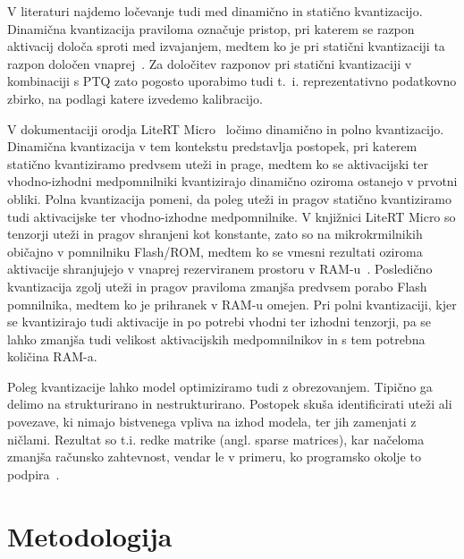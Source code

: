\documentclass[a4paper,twoside,openright,12pt,slovene]{book}
\begin{document}
        V literaturi najdemo ločevanje tudi med dinamično in statično kvantizacijo. Dinamična kvantizacija praviloma označuje pristop, pri katerem se razpon aktivacij določa sproti med izvajanjem, medtem ko je pri statični kvantizaciji ta razpon določen vnaprej~\cite{src:gholami2022survey, src:jacob2018quantization}. Za določitev razponov pri statični kvantizaciji v kombinaciji s PTQ zato pogosto uporabimo tudi t.~i. reprezentativno podatkovno zbirko, na podlagi katere izvedemo kalibracijo.

        V dokumentaciji orodja LiteRT Micro~\cite{src:litertmicro, src:david2021tensorflowlitemicro} ločimo dinamično in polno kvantizacijo. Dinamična kvantizacija v tem kontekstu predstavlja postopek, pri katerem statično kvantiziramo predvsem uteži in prage, medtem ko se aktivacijski ter vhodno-izhodni medpomnilniki kvantizirajo dinamično oziroma ostanejo v prvotni obliki. Polna kvantizacija pomeni, da poleg uteži in pragov statično kvantiziramo tudi aktivacijske ter vhodno-izhodne medpomnilnike.
        V knjižnici LiteRT Micro so tenzorji uteži in pragov shranjeni kot konstante, zato so na mikrokrmilnikih običajno v pomnilniku Flash/ROM, medtem ko se vmesni rezultati oziroma aktivacije shranjujejo v vnaprej rezerviranem prostoru v RAM-u~\cite{src:litertmicro}. Posledično kvantizacija zgolj uteži in pragov praviloma zmanjša predvsem porabo Flash pomnilnika, medtem ko je prihranek v RAM-u omejen. Pri polni kvantizaciji, kjer se kvantizirajo tudi aktivacije in po potrebi vhodni ter izhodni tenzorji, pa se lahko zmanjša tudi velikost aktivacijskih medpomnilnikov in s tem potrebna količina RAM-a.

        Poleg kvantizacije lahko model optimiziramo tudi z obrezovanjem. Tipično ga delimo na strukturirano in nestrukturirano. Postopek skuša identificirati uteži ali povezave, ki nimajo bistvenega vpliva na izhod modela, ter jih zamenjati z ničlami. Rezultat so t.i. redke matrike (angl. sparse matrices), kar načeloma zmanjša računsko zahtevnost, vendar le v primeru, ko programsko okolje to podpira~\cite{src:Nikodinovska_2024}. %

\chapter{Metodologija} \label{sct:metodologija}
\end{document}
